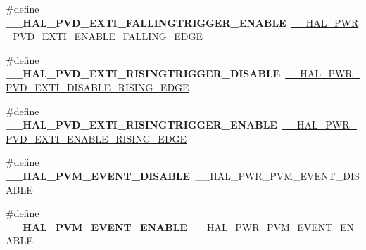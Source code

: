 \begin{DoxyCompactItemize}
\#define {\bfseries \+\_\+\+\_\+\+H\+A\+L\+\_\+\+P\+V\+D\+\_\+\+E\+X\+T\+I\+\_\+\+F\+A\+L\+L\+I\+N\+G\+T\+R\+I\+G\+G\+E\+R\+\_\+\+E\+N\+A\+B\+LE}~\mbox{\hyperlink{group___p_w_r___exported___macro_ga5b971478563a00e1ee1a9d8ca8054e08}{\+\_\+\+\_\+\+H\+A\+L\+\_\+\+P\+W\+R\+\_\+\+P\+V\+D\+\_\+\+E\+X\+T\+I\+\_\+\+E\+N\+A\+B\+L\+E\+\_\+\+F\+A\+L\+L\+I\+N\+G\+\_\+\+E\+D\+GE}}
\item 
\mbox{\label{group___h_a_l___p_w_r___aliased___macros_gae3b63df648b371b5957ecdcb408cb402}} 
\#define {\bfseries \+\_\+\+\_\+\+H\+A\+L\+\_\+\+P\+V\+D\+\_\+\+E\+X\+T\+I\+\_\+\+R\+I\+S\+I\+N\+G\+T\+R\+I\+G\+G\+E\+R\+\_\+\+D\+I\+S\+A\+B\+LE}~\mbox{\hyperlink{group___p_w_r___exported___macro_ga1ca8fd7f3286a176f6be540c75a004c6}{\+\_\+\+\_\+\+H\+A\+L\+\_\+\+P\+W\+R\+\_\+\+P\+V\+D\+\_\+\+E\+X\+T\+I\+\_\+\+D\+I\+S\+A\+B\+L\+E\+\_\+\+R\+I\+S\+I\+N\+G\+\_\+\+E\+D\+GE}}
\item 
\mbox{\label{group___h_a_l___p_w_r___aliased___macros_ga1608e4dfa0c4c753ab68e38a40cea4ab}} 
\#define {\bfseries \+\_\+\+\_\+\+H\+A\+L\+\_\+\+P\+V\+D\+\_\+\+E\+X\+T\+I\+\_\+\+R\+I\+S\+I\+N\+G\+T\+R\+I\+G\+G\+E\+R\+\_\+\+E\+N\+A\+B\+LE}~\mbox{\hyperlink{group___p_w_r___exported___macro_ga7bef3f30c9fe267c99d5240fbf3f878c}{\+\_\+\+\_\+\+H\+A\+L\+\_\+\+P\+W\+R\+\_\+\+P\+V\+D\+\_\+\+E\+X\+T\+I\+\_\+\+E\+N\+A\+B\+L\+E\+\_\+\+R\+I\+S\+I\+N\+G\+\_\+\+E\+D\+GE}}
\item 
\mbox{\label{group___h_a_l___p_w_r___aliased___macros_gab12d231c421f03366b7836a06aa1f56f}} 
\#define {\bfseries \+\_\+\+\_\+\+H\+A\+L\+\_\+\+P\+V\+M\+\_\+\+E\+V\+E\+N\+T\+\_\+\+D\+I\+S\+A\+B\+LE}~\+\_\+\+\_\+\+H\+A\+L\+\_\+\+P\+W\+R\+\_\+\+P\+V\+M\+\_\+\+E\+V\+E\+N\+T\+\_\+\+D\+I\+S\+A\+B\+LE
\item 
\mbox{\label{group___h_a_l___p_w_r___aliased___macros_ga304cbc4a6e794a90f9af92c037036a03}} 
\#define {\bfseries \+\_\+\+\_\+\+H\+A\+L\+\_\+\+P\+V\+M\+\_\+\+E\+V\+E\+N\+T\+\_\+\+E\+N\+A\+B\+LE}~\+\_\+\+\_\+\+H\+A\+L\+\_\+\+P\+W\+R\+\_\+\+P\+V\+M\+\_\+\+E\+V\+E\+N\+T\+\_\+\+E\+N\+A\+B\+LE
\item 
\mbox{\label{group___h_a_l___p_w_r___aliased___macros_gae4335ce98bf55ece8ba9b5cbb2c196f4}} 

\end{DoxyCompactItemize}
